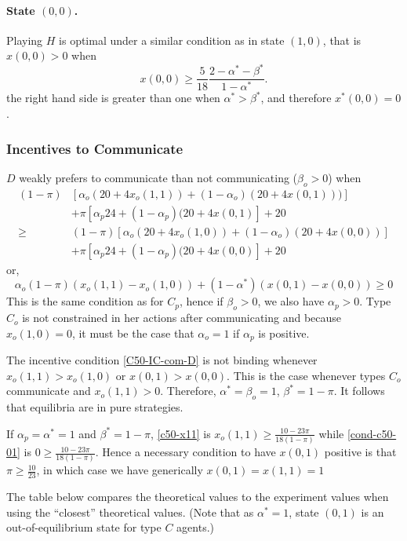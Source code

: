 \documentclass[12pt]{article}
\theoremstyle{break}
\begin{document}
%
\paragraph{State $(0,0)$.} Playing $H$ is optimal under a similar condition as in state $(1,0)$, that is $x(0,0)>0$ when
\[
x(0,0)\geq \frac{5}{18}\frac{2-\alpha^*-\beta^*}{1-\alpha^*}.
\]
the right hand side is greater than one when $\alpha^*>\beta^*$, and therefore $x^*(0,0)=0$.

\subsubsection*{Incentives to Communicate}
$D$ weakly prefers to communicate than not communicating ($\beta_o>0$) when
\[\begin{split}
(1-\pi)&[\alpha_o(20+4 x_o(1,1))+(1-\alpha_o)(20+4x(0,1)))]\\ 
&+\pi [\alpha_p 24+(1-\alpha_p)(20+4x(0,1)]+20\\ 
	\geq	&(1-\pi)[\alpha_o(20+4 x_o(1,0))+(1-\alpha_o)(20+4x(0,0))]\\ 
	&+\pi [\alpha_p 24+(1-\alpha_p)(20+4x(0,0)]+20
\end{split}
\]
or,
\begin{equation}\label{C50-IC-com-D}
\alpha_o (1-\pi) (x_o(1,1)-x_o(1,0))+(1-\alpha^*)(x(0,1)-x(0,0))\geq 0
\end{equation}
%
This is the same condition as for $C_p$, hence if $\beta_o>0$, we also have $\alpha_p>0$. Type $C_o$ is not constrained in her actions after communicating and because $x_o(1,0)=0$, it must be the case that $\alpha_o=1$ if $\alpha_p$ is positive. 

The incentive condition \eqref{C50-IC-com-D} is not binding whenever 
$x_o(1,1)>x_o(1,0)$ or $x(0,1)>x(0,0)$. This is the case whenever types $C_o$ communicate and $x_o(1,1)>0$. Therefore, $\alpha^*=\beta_o=1$, $\beta^* = 1-\pi$. It follows that equilibria are in pure strategies.

If $\alpha_p=\alpha^*=1$ and $\beta^*=1-\pi$, \eqref{c50-x11} is $x_o(1,1)\geq \frac{10-23\pi}{18(1-\pi)}$ while \eqref{cond-c50-01} is $0\geq \frac{10-23\pi}{18(1-\pi)}$. Hence a necessary condition to have $x(0,1)$ positive is that $\pi\geq \frac{10}{23}$, in which case we have generically $x(0,1)=x(1,1)=1$

The table below compares the theoretical values to the experiment values when using the ``closest'' theoretical values. (Note that as $\alpha^*=1$, state $(0,1)$ is an out-of-equilibrium state for type $C$ agents.)
\end{document}
